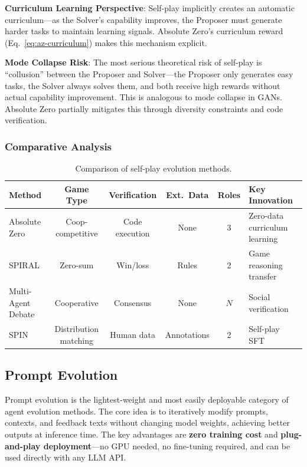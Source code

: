 \textbf{Curriculum Learning Perspective}: Self-play implicitly creates an automatic curriculum---as the Solver's capability improves, the Proposer must generate harder tasks to maintain learning signals. Absolute Zero's curriculum reward (Eq.~\ref{eq:az-curriculum}) makes this mechanism explicit.

\textbf{Mode Collapse Risk}: The most serious theoretical risk of self-play is ``collusion'' between the Proposer and Solver---the Proposer only generates easy tasks, the Solver always solves them, and both receive high rewards without actual capability improvement. This is analogous to mode collapse in GANs. Absolute Zero partially mitigates this through diversity constraints and code verification.

\subsubsection{Comparative Analysis}

\begin{table}[htbp]
\centering
\caption{Comparison of self-play evolution methods.}
\label{tab:selfplay-compare}
\begin{tabular}{lccccp{40mm}}
\toprule
\textbf{Method} & \textbf{Game Type} & \textbf{Verification} & \textbf{Ext.\ Data} & \textbf{Roles} & \textbf{Key Innovation} \\
\midrule
Absolute Zero & Coop-competitive & Code execution & None & 3 & Zero-data curriculum learning \\
SPIRAL & Zero-sum & Win/loss & Rules & 2 & Game reasoning transfer \\
Multi-Agent Debate & Cooperative & Consensus & None & $N$ & Social verification \\
SPIN & Distribution matching & Human data & Annotations & 2 & Self-play SFT \\
\bottomrule
\end{tabular}
\end{table}

\subsection{Prompt Evolution}\label{sec:prompt}

Prompt evolution is the lightest-weight and most easily deployable category of agent evolution methods. The core idea is to iteratively modify prompts, contexts, and feedback texts without changing model weights, achieving better outputs at inference time. The key advantages are \textbf{zero training cost} and \textbf{plug-and-play deployment}---no GPU needed, no fine-tuning required, and can be used directly with any LLM API.

